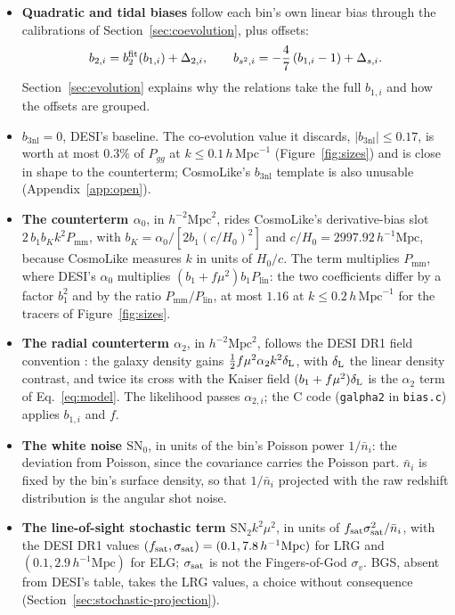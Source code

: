 \documentclass[11pt]{article}
\newcommand{\bone}{b_1}            %
\newcommand{\btwo}{b_2}            %
\newcommand{\bthree}{b_{3\mathrm{nl}}} %
\newcommand{\plin}{P_{\mathrm{lin}}}
\newcommand{\pnl}{P_{\mathrm{mm}}}
\newcommand{\hMpc}{\,h\,\mathrm{Mpc}^{-1}}
\newcommand{\Mpch}{\,h^{-1}\mathrm{Mpc}}
\newcommand{\SNz}{\mathrm{SN}_0}
\newcommand{\SNt}{\mathrm{SN}_2}
\begin{document}
\begin{itemize}
\item \textbf{Quadratic and tidal biases} follow each bin's own linear
bias through the calibrations of Section~\ref{sec:coevolution}, plus
offsets:
\begin{equation}
b_{2,i} = \btwo^{\rm fit}(b_{1,i}) + \Delta_{2,i} , \qquad
b_{s^2,i} = -\frac{4}{7}\left(b_{1,i} - 1\right) + \Delta_{s,i} .
\label{eq:perbin-evolution}
\end{equation}
Section~\ref{sec:evolution} explains why the relations take the full
$b_{1,i}$ and how the offsets are grouped.
\item \textbf{$\bthree = 0$}, DESI's baseline.  The co-evolution value
it discards, $|\bthree| \le 0.17$, is worth at most $0.3\%$ of
$P_{gg}$ at $k \le 0.1\hMpc$ (Figure~\ref{fig:sizes}) and is close in
shape to the counterterm; CosmoLike's $\bthree$ template is also
unusable (Appendix~\ref{app:open}).
\item \textbf{The counterterm $\alpha_0$}, in $h^{-2}\mathrm{Mpc}^2$,
rides CosmoLike's derivative-bias slot $2\,\bone b_K k^2\pnl$, with
$b_K = \alpha_0/[2\bone (c/H_0)^2]$ and $c/H_0 = 2997.92\Mpch$, because
CosmoLike measures $k$ in units of $H_0/c$.  The term multiplies
$\pnl$, where DESI's $\alpha_0$ multiplies $(\bone + f\mu^2)\bone\plin$:
the two coefficients differ by a factor $\bone^2$ and by the ratio
$\pnl/\plin$, at most $1.16$ at $k \le 0.2\hMpc$ for the tracers of
Figure~\ref{fig:sizes}.
\item \textbf{The radial counterterm $\alpha_2$}, in
$h^{-2}\mathrm{Mpc}^2$, follows the DESI DR1 field convention
\cite{Maus2024}: the galaxy density gains
$\tfrac12 f\mu^2\alpha_2 k^2\delta_{\rm L}$, with $\delta_{\rm L}$ the
linear density contrast, and twice its cross with the Kaiser field
$(\bone + f\mu^2)\delta_{\rm L}$ is the $\alpha_2$ term of
Eq.~\eqref{eq:model}.  The likelihood passes $\alpha_{2,i}$; the C code
(\texttt{galpha2} in \texttt{bias.c}) applies $b_{1,i}$ and $f$.
\item \textbf{The white noise $\SNz$}, in units of the bin's Poisson
power $1/\bar{n}_i$: the deviation from Poisson, since the covariance
carries the Poisson part.  $\bar{n}_i$ is fixed by the bin's surface
density, so that $1/\bar{n}_i$ projected with the raw redshift
distribution is the angular shot noise.
\item \textbf{The line-of-sight stochastic term $\SNt k^2\mu^2$}, in
units of $f_{\rm sat}\sigma_{\rm sat}^2/\bar{n}_i$, with the DESI DR1
values \cite{Maus2024} $(f_{\rm sat}, \sigma_{\rm sat}) =
(0.1, 7.8\Mpch)$ for LRG and $(0.1, 2.9\Mpch)$ for ELG; $\sigma_{\rm
sat}$ is not the Fingers-of-God $\sigma_v$.  BGS, absent from DESI's
table, takes the LRG values, a choice without consequence
(Section~\ref{sec:stochastic-projection}).
\end{itemize}
\end{document}

